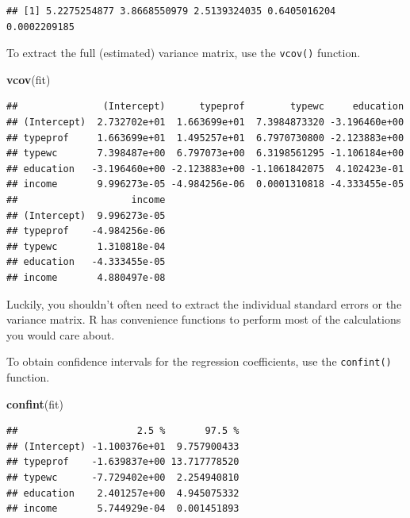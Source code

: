 \documentclass[
  12pt,
  oneside,openany]{book}
\newenvironment{Shaded}{\begin{snugshade}}{\end{snugshade}}
\newcommand{\KeywordTok}[1]{\textcolor[rgb]{0.13,0.29,0.53}{\textbf{#1}}}
\newcommand{\NormalTok}[1]{#1}
\newcommand{\OperatorTok}[1]{\textcolor[rgb]{0.81,0.36,0.00}{\textbf{#1}}}
\begin{document}
\begin{Shaded}
\end{Shaded}

\begin{verbatim}
## [1] 5.2275254877 3.8668550979 2.5139324035 0.6405016204 0.0002209185
\end{verbatim}

To extract the full (estimated) variance matrix, use the \texttt{vcov()} function.

\begin{Shaded}
\begin{Highlighting}[]
\KeywordTok{vcov}\NormalTok{(fit)}
\end{Highlighting}
\end{Shaded}

\begin{verbatim}
##               (Intercept)      typeprof        typewc     education
## (Intercept)  2.732702e+01  1.663699e+01  7.3984873320 -3.196460e+00
## typeprof     1.663699e+01  1.495257e+01  6.7970730800 -2.123883e+00
## typewc       7.398487e+00  6.797073e+00  6.3198561295 -1.106184e+00
## education   -3.196460e+00 -2.123883e+00 -1.1061842075  4.102423e-01
## income       9.996273e-05 -4.984256e-06  0.0001310818 -4.333455e-05
##                    income
## (Intercept)  9.996273e-05
## typeprof    -4.984256e-06
## typewc       1.310818e-04
## education   -4.333455e-05
## income       4.880497e-08
\end{verbatim}

Luckily, you shouldn't often need to extract the individual standard errors or the variance matrix. R has convenience functions to perform most of the calculations you would care about.

To obtain confidence intervals for the regression coefficients, use the \texttt{confint()} function.

\begin{Shaded}
\begin{Highlighting}[]
\KeywordTok{confint}\NormalTok{(fit)}
\end{Highlighting}
\end{Shaded}

\begin{verbatim}
##                     2.5 %       97.5 %
## (Intercept) -1.100376e+01  9.757900433
## typeprof    -1.639837e+00 13.717778520
## typewc      -7.729402e+00  2.254940810
## education    2.401257e+00  4.945075332
## income       5.744929e-04  0.001451893
\end{verbatim}
\end{document}
